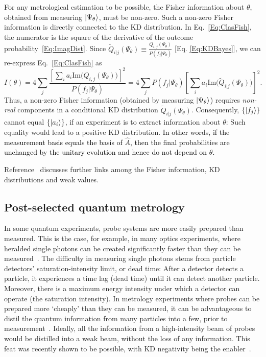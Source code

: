 \documentclass[%
 reprint,
superscriptaddress,
nofootinbib,
bibnotes,
 amsmath,amssymb,
 aps,
]{revtex4-1}
\theoremstyle{plain}
\newcommand{\Dave}[1]{\textcolor{black}{#1} }
\newcommand{\im}{\mathrm{Im}}
\newcommand{\PsiT}{\Psi_{\theta}}
\begin{document}
For any metrological estimation to be possible, the Fisher information about $\theta$, obtained from measuring $\ket{\Psi_{\theta}}$, must be non-zero. Such
 a non-zero Fisher information  is directly connected to the KD distribution. In Eq.~\eqref{Eq:ClasFish}, the numerator is the square of the derivative of the outcome probability~\eqref{Eq:ImagDist}. Since 
 $\tilde{Q}_{i|j} \left( \Psi_{\theta} \right) 
\equiv \frac{Q_{i,j} \left( \Psi_{\theta} \right) }{P(f_{j}|\Psi_{\theta})}$ [Eq. \eqref{Eq:KDBayes}], we can re-express Eq.~\eqref{Eq:ClasFish} as
\begin{equation}
I(\theta) 
= 4 \sum_j \frac{\left[ \sum_i a_i \im \bm{(} Q_{i,j}(\PsiT)  \bm{)}   \right]^2}{P(f_{j}|\Psi_{\theta}) }  = 4 \sum_j P(f_j | \Psi_{\theta} ) \left[ \sum_i a_i \im \bm{(} \tilde{Q}_{i|j} \left( \Psi_{\theta} \right) \bm{)}   \right]^2 
.
\end{equation}
Thus, a non-zero Fisher information (obtained by measuring $\ket{\PsiT}$) requires \emph{non-real} components  in a conditional KD distribution $\tilde{Q}_{i|j} \left( \Psi_{\theta} \right)$.
Consequently, $\{ \ket{f_j} \}$ cannot equal $\{ \ket{a_i} \}$, if an experiment is to extract information about $\theta$: Such equality would lead to a positive KD distribution. 
\Dave{In other words, if the measurement basis equals the basis of $\hat{A}$, then the final probabilities are unchanged by the unitary evolution and hence do not depend on $\theta$.}

Reference~\cite{Hofmann2011} discusses further links among the Fisher information, KD distributions and weak values. 

\subsection{Post-selected quantum metrology}
\label{SubSec:PSMetrology}

In some quantum experiments,  probe systems are more easily prepared than measured. This is the case, for example, in many optics experiments, where heralded single photons can be created 
significantly faster than they can be measured~\cite{Tomm21, Lupu22}. 
The difficulty in measuring single photons stems from particle detectors' saturation-intensity limit, or dead time: After a detector detects a particle, it experiences a time lag (dead time) until it can detect another particle. Moreover, there is a maximum energy intensity under which a detector can operate (the saturation intensity).  In metrology experiments where probes can be prepared more `cheaply' than they can be measured, it can be advantageous to distil the quantum information from many particles into a few, prior to measurement~\cite{Dressel14,  Harris17, Xu20, ArvidssonShukur20,Lupu22, Jenne22,Salvati23, ArvShuk23}.  Ideally, all the information from a high-intensity beam of probes would be distilled into a weak beam, without the loss of any information.  This feat was recently shown to be possible, with KD negativity being the enabler~\cite{Jenne22,Salvati23}.
\end{document}
